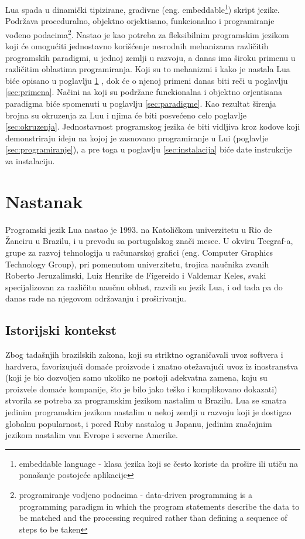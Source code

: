 \documentclass[a4paper]{article}
\begin{document}
 Lua spada u dinamički tipizirane, gradivne (eng. embeddable\footnote{embeddable language - klasa jezika koji se često koriste da prošire ili utiču na ponašanje postojeće aplikacije}) skript jezike. Podržava proceduralno, objektno orjektisano, funkcionalno i programiranje vođeno podacima\footnote{programiranje vodjeno podacima - data-driven programming is a programming paradigm in which the program statements describe the data to be matched and the processing required rather than defining a sequence of steps to be taken}.
Nastao je kao potreba za fleksibilnim programskim jezikom koji će omogućiti jednostavno korišćenje nesrodnih mehanizama različitih programskih paradigmi, u jednoj zemlji u razvoju, a danas ima široku primenu u različitim oblastima programiranja. Koji su to mehanizmi i kako je nastala Lua biće opisano u poglavlju \ref{sec:nastanak} , dok će o njenoj primeni danas biti reči u poglavlju \ref{sec:primena}. Načini na koji su podržane funckionalna i objektno orjentisana paradigma biće spomenuti u poglavlju \ref{sec:paradigme}. Kao rezultat širenja brojna su okruzenja za Luu i njima će biti posvećeno celo poglavlje \ref{sec:okruzenja}. Jednostavnost programskog jezika će biti vidljiva kroz kodove koji demonstriraju ideju na kojoj je zasnovano programiranje u Lui (poglavlje \ref{sec:programiranje}), a pre toga u poglavlju \ref{sec:instalacija} biće date instrukcije za instalaciju.

\section{Nastanak}
\label{sec:nastanak}

Programski jezik Lua nastao je 1993. na Katoličkom univerzitetu u Rio de Žaneiru u Brazilu, i u prevodu sa portugalskog znači mesec. U okviru Tecgraf-a, grupe za razvoj tehnologija u računarskoj grafici (eng. Computer Graphics Technology Group), pri pomenutom univerzitetu, trojica naučnika zvanih Roberto Jeruzalimski, Luiz Henrike de Figereido i Valdemar Keles, svaki specijalizovan za različitu naučnu oblast, razvili su jezik Lua, i od tada pa do danas rade na njegovom održavanju i proširivanju.

\subsection{Istorijski kontekst}


Zbog tadašnjih brazilskih zakona, koji su striktno ograničavali uvoz softvera i hardvera, favorizujući domaće proizvode i znatno otežavajući uvoz iz inostranstva (koji je bio dozvoljen samo ukoliko ne postoji adekvatna zamena, koju su proizvele domaće kompanije, što je bilo jako teško i komplikovano dokazati) stvorila se potreba za programskim jezikom nastalim u Brazilu. Lua se smatra jedinim programskim jezikom nastalim u nekoj zemlji u razvoju koji je dostigao globalnu popularnost, i pored Ruby nastalog u Japanu, jedinim značajnim jezikom nastalim van Evrope i severne Amerike.
\end{document}
